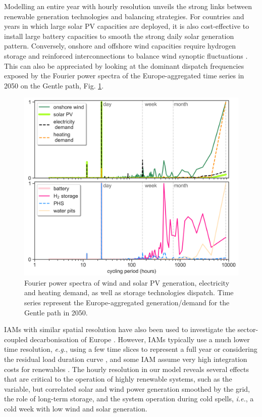 \documentclass[5p]{elsarticle} %
\begin{document}
Modelling an entire year with hourly resolution unveils the strong links between renewable generation technologies and balancing strategies. For countries and years in which large solar PV capacities are deployed, it is also cost-effective to install large battery capacities to smooth the strong daily solar generation pattern. Conversely, onshore and offshore wind capacities require hydrogen storage and reinforced interconnections to balance wind synoptic fluctuations \cite{Rasmussen_2012, Schlachtberger_2017, Victoria_2019_storage}. %
This can also be appreciated by looking at the dominant dispatch frequencies exposed by the Fourier power spectra of the Europe-aggregated time series in 2050 on the Gentle path, Fig. \ref{fig_Fourier}. \\

\begin{figure}[!h]
\centering
\includegraphics[width=\columnwidth]{../figures/Fourier.png}
\caption{Fourier power spectra of wind and solar PV generation, electricity and heating demand, as well as storage technologies dispatch. Time series represent the Europe-aggregated generation/demand for the Gentle path in 2050.} \label{fig_Fourier} 
\end{figure}

IAMs with similar spatial resolution have also been used to investigate the sector-coupled decarbonisation of Europe \cite{in-depth_2018, JRC-EU-TIMES, Creutzig_2017}. However, IAMs typically use a much lower time resolution, \textit{e.g.}, using a few time slices to represent a full year \cite{JRC-EU-TIMES, Loffler_2019, Poncelet_2016, McGlade_2015, Babrowski_2014} or considering the residual load duration curve \cite{Creutzig_2017, Ueckerdt_2017}, and some IAM assume very high integration costs for renewables \cite{Pietzcker_2014}. The hourly resolution in our model reveals several effects that are critical to the operation of highly renewable systems, such as the variable, but correlated solar and wind power generation smoothed by the grid, the role of long-term storage, and the system operation during cold spells, \textsl{i.e.}, a cold week with low wind and solar generation.
\end{document}
